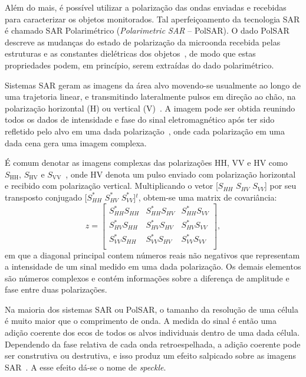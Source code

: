 \documentclass[12pt]{article}
\begin{document}
Além do mais, é possível utilizar a polarização das ondas enviadas e recebidas para caracterizar os objetos monitorados. Tal aperfeiçoamento da tecnologia SAR é chamado SAR Polarimétrico (\textit{Polarimetric SAR} -- PolSAR). 
O dado PolSAR descreve as mudanças do estado de polarização da microonda recebida pelas estruturas e as constantes dielétricas dos objetos~\cite{Ouchi13}, de modo que estas propriedades podem, em princípio, serem extraídas do dado polarimétrico. 

Sistemas SAR geram as imagens da área alvo movendo-se usualmente ao longo de uma trajetoria linear, e transmitindo lateralmente pulsos em direção ao chão, na polarização horizontal (H) ou vertical (V)~\cite{Richards09}. 
A imagem pode ser obtida reunindo todos os dados de intensidade e fase do sinal eletromagnético após ter sido refletido pelo alvo em uma dada polarização~\cite{Pottier09}, onde cada polarização em uma dada cena gera uma imagem complexa.

É comum denotar as imagens complexas das polarizações HH, VV e HV como $S_{\text{HH}}$, $S_{\text{HV}}$ e $S_{\text{VV}}$~\cite{Frery15}, 
onde HV denota um pulso enviado com polarização horizontal e recibido com polarização vertical. Multiplicando o vetor [$S_{HH}$  $S_{HV}$ $S_{VV}$] por seu transposto conjugado [$S_{HH}^*$  $S_{HV}^*$ $S_{VV}^*$]$^t$, obtem-se uma matrix de covariância:
\[
z = 
\begin{bmatrix}
	S_{HH}^*S_{HH} & S_{HH}^*S_{HV} & S_{HH}^*S_{VV}\\
    S_{HV}^*S_{HH} & S_{HV}^*S_{HV} & S_{HV}^*S_{VV}\\
    S_{VV}^*S_{HH} & S_{VV}^*S_{HV} & S_{VV}^*S_{VV}\\
\end{bmatrix},
\]
em que a diagonal principal contem números reais não negativos que representam a intensidade de um sinal medido em uma dada polarização. 
Os demais elementos são números complexos e contém informações sobre a diferença de amplitude e fase entre duas polarizações.

Na maioria dos sistemas SAR ou PolSAR, o tamanho da resolução de uma célula é muito maior que o comprimento de onda. 
A medida  do sinal é então uma adição coerente dos ecos de todos os alvos individuais dentro de uma dada célula. 
Dependendo da fase relativa de cada onda retroespelhada, a adição coerente pode ser construtiva ou destrutiva, e isso produz um efeito salpicado sobre as imagens SAR~\cite{Goodman76}. 
A esse efeito dá-se o nome de \textit{speckle}.
\end{document}

